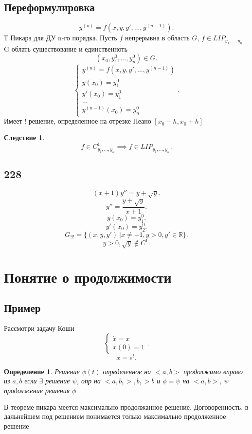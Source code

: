 \documentclass[14pt]{extarticle}
\newtheorem{definition}{Определение}
\newtheorem{corollary}{Следствие}[theorem]
\begin{document}
 \subsection{Переформулировка}
 \[
 y^{(n)} = f(x,y,y',\dots,y^{(n-1)})
 .\] 
 Т Пикара для ДУ n-го порядка. Пусть $f$ непрерывна в область  $G$,  $f \in LIP_{y_1,\dots,y_{n}}$
 G облать существование и единственноть
 \[
     (x_0,y_1^{0},\dots,y_{n}^{0}) \in G
 .\] 
 \[
 \begin{cases}
     y^{(n)} = f(x,y,y',\dots,y^{(n - 1)})\\
     y(x_0) = y_{1}^{0}\\
     y'( x_0) =  y_{1}^{0}\\
     \dots\\
     y^{(n - 1)} (x_0) = y_{n}^{0}
  \end{cases}
 .\] 
 Имеет $!$ решение, определенное на отрезке Пеано  $[x_{0}- h, x_{0}+ h]$
 \begin{corollary}
     \[
     f \in C^{1}_{y_1,\dots,y_{n}} \implies f \in LIP_{y_1,\dots,y_{n}}
     .\] 
 \end{corollary}
 \subsection{228}
 \[
     (x + 1) y'' = y + \sqrt{y} 
 .\] 
 \[
 y'' = \frac{y + \sqrt{y} }{x + 1}
 .\] 
 \[
 y(x_0) = y_1^{0}
 .\] 
 \[
 y'(x_0) = y_2^{0}
 .\] 
 \[
     G_{\exists !} = \{(x,y,y')\ | x\neq -1, y >  0, y' \in \mathbb{R}\}
 .\] 
 \[
 y > 0 , \sqrt{y}  \notin C^{1}
 .\] 
 \section{Понятие о продолжимости}
 \subsection{Пример}
 Рассмотри задачу Коши
 \[
 \begin{cases}
     \dot{x} = x\\
     x(0) = 1
 \end{cases}
 .\] 
 \[
     x = e^{t}
 .\] 
 \begin{definition}
     Решение $\phi(t)$ определенное на  $<a,b>$ продолжимо вправо из  $a,b$ если  $\exists $ решение $\psi$, опр на 
      $<a,b_1>,b_1 > b$ и $\phi =  \psi$ на $<a,b>$,  $\psi$ продолжение решения  $\phi$
 \end{definition}
 В теореме пикара меется максимально продолжанное решение.
 Договоренность, в дальнейшем под решением понимается только максимально продолженное решение
\end{document}
